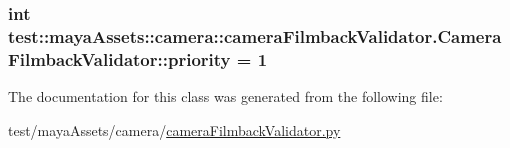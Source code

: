\hypertarget{classtest_1_1mayaAssets_1_1camera_1_1cameraFilmbackValidator_1_1CameraFilmbackValidator_abd75e42d3d8250430cc57542ce864482}{
\subsubsection[{priority}]{\setlength{\rightskip}{0pt plus 5cm}int {\bf test\-::maya\-Assets\-::camera\-::camera\-Filmback\-Validator.\-Camera\-Filmback\-Validator\-::priority} = 1}}\label{d3/d05/classtest_1_1mayaAssets_1_1camera_1_1cameraFilmbackValidator_1_1CameraFilmbackValidator_abd75e42d3d8250430cc57542ce864482}


\-The documentation for this class was generated from the following file\-:\begin{DoxyCompactItemize}
\item 
test/maya\-Assets/camera/\hyperlink{mayaAssets_2camera_2cameraFilmbackValidator_8py}{camera\-Filmback\-Validator.\-py}\end{DoxyCompactItemize}
